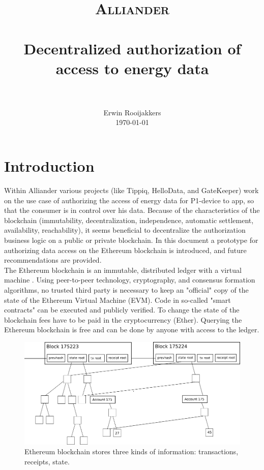 \documentclass[paper=a4, fontsize=11pt]{scrartcl}
\title{
  \usefont{OT1}{bch}{b}{n}
  \normalfont \normalsize \textsc{Alliander} \\ [25pt]
  \horrule{0.5pt} \\[0.4cm]
  \huge Decentralized authorization of access to energy data \\
  \horrule{2pt} \\[0.5cm]
}
\author{
\normalfont \normalsize
Erwin Rooijakkers\\[-3pt] \normalsize
\today
}
\date{}
\numberwithin{equation}{section} %
\numberwithin{figure}{section}   %
\numberwithin{table}{section}    %
\begin{document}
\maketitle

\section{Introduction}


Within Alliander various projects (like Tippiq, HelloData, and GateKeeper) work
on the use case of authorizing the access of energy data for P1-device to app,
so that the consumer is in control over his data. Because of the characteristics
of the blockchain (immutability, decentralization, independence, automatic
settlement, availability, reachability), it seems beneficial to decentralize the
authorization business logic on a public or private blockchain. In this document
a prototype for authorizing data access on the Ethereum blockchain is
introduced, and future recommendations are provided.\\

The Ethereum blockchain is an immutable, distributed ledger with a virtual
machine \cite{ethereum}. Using peer-to-peer technology, cryptography, and
consensus formation algorithms, no trusted third party is necessary to keep an
"official" copy of the state of the Ethereum Virtual Machine (EVM). Code in
so-called "smart contracts" can be executed and publicly verified. To change the
state of the blockchain fees have to be paid in the cryptocurrency (Ether).
Querying the Ethereum blockchain is free and can be done by anyone with access
to the ledger.\\

\begin{figure}[h]
  \centering
  \includegraphics[width=\textwidth]{ethblockchain_full}
  \caption{Ethereum blockchain stores three kinds of information: transactions, receipts, state.}
  \label{fig:ethblockchain_full}
\end{figure}
\end{document}
